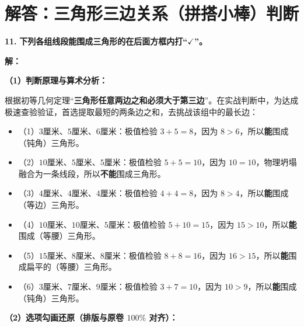 \newpage



\section{解答：三角形三边关系（拼搭小棒）判断}

\vspace{0.6cm}

\textbf{\LARGE 11.} \textbf{下列各组线段能围成三角形的在后面方框内打“$\checkmark$”。}

\vspace{0.4cm}
\textbf{解：}

\textbf{（1）判断原理与算术分析：}

根据初等几何定理“\textbf{三角形任意两边之和必须大于第三边}”。在实战判断中，为达成极速查验验证，首选提取最短的两条边之和，去挑战该组中的最长边：
\begin{itemize}
    \item （1）$3\text{厘米}$、$5\text{厘米}、6\text{厘米}$：极值检验 $3 + 5 = 8$，因为 $8 > 6$，所以\textbf{能}围成（钝角）三角形。
    \item （2）$10\text{厘米}$、$5\text{厘米}、5\text{厘米}$：极值检验 $5 + 5 = 10$，因为 $10 = 10$，物理坍塌融合为一条线段，所以\textbf{不能}围成三角形。
    \item （3）$4\text{厘米}$、$4\text{厘米}、4\text{厘米}$：极值检验 $4 + 4 = 8$，因为 $8 > 4$，所以\textbf{能}围成（等边）三角形。
    \item （4）$10\text{厘米}$、$10\text{厘米}、5\text{厘米}$：极值检验 $5 + 10 = 15$，因为 $15 > 10$，所以\textbf{能}围成（等腰）三角形。
    \item （5）$15\text{厘米}$、$8\text{厘米}、8\text{厘米}$：极值检验 $8 + 8 = 16$，因为 $16 > 15$，所以\textbf{能}围成扁平的（等腰）三角形。
    \item （6）$3\text{厘米}$、$7\text{厘米}、9\text{厘米}$：极值检验 $3 + 7 = 10$，因为 $10 > 9$，所以\textbf{能}围成（钝角）三角形。
\end{itemize}

\textbf{（2）选项勾画还原（排版与原卷 $100\%$ 对齐）：}

\def\emptybox{\tikz[baseline=-0.15em]{\draw[line width=0.6pt] (0,0) rectangle (0.4,0.4);}}
\def\checkedbox{\tikz[baseline=-0.15em]{
    \draw[line width=0.6pt] (0,0) rectangle (0.4,0.4);
    \draw[line width=1.2pt, red!80!black, line cap=round, line join=round] (0.05, 0.2) -- (0.15, 0.05) -- (0.5, 0.5);
}}

